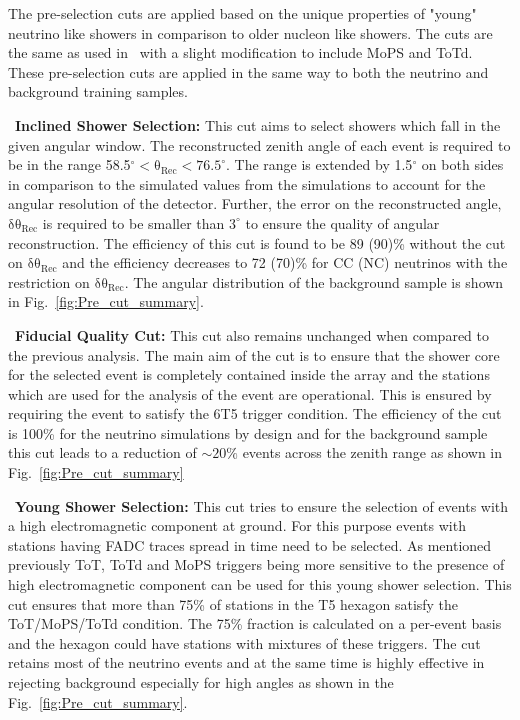 The pre-selection cuts are applied based on the unique properties of "young" neutrino like showers in comparison to older nucleon like showers. The cuts are the same as used in~\cite{gap_note_2013} with a slight modification to include MoPS and ToTd. These pre-selection cuts are applied in the same way to both the neutrino and background training samples. 
\begin{description}
  \item ~\textbf{Inclined Shower Selection:} This cut aims to select showers which fall in the given angular window. The reconstructed zenith angle of each event is required to be in the range 58.5$^{\circ} < \mathrm{\theta_{Rec} < 76.5^{\circ}}$. The range is extended by 1.5$^\circ$ on both sides in comparison to the simulated values from the simulations to account for the angular resolution of the detector. Further, the error on the reconstructed angle, $\mathrm{\delta \theta_{\text{Rec}}}$ is required to be smaller than $3^\circ$ to ensure the quality of angular reconstruction. The efficiency of this cut is found to be 89 (90)\% without the cut on $\mathrm{\delta \theta_{\text{Rec}}}$ and the efficiency decreases to 72 (70)\% for CC (NC) neutrinos with the restriction on $\mathrm{\delta \theta_{\text{Rec}}}$. The angular distribution of the background sample is shown in Fig.~\ref{fig:Pre_cut_summary}.
  \item ~\textbf{Fiducial Quality Cut:} This cut also remains unchanged when compared to the previous analysis. The main aim of the cut is to ensure that the shower core for the selected event is completely contained inside the array and the stations which are used for the analysis of the event are operational. This is ensured by requiring the event to satisfy the 6T5 trigger condition. The efficiency of the cut is 100\% for the neutrino simulations by design and for the background sample this cut leads to a reduction of $\sim 20\%$ events across the zenith range as shown in Fig.~\ref{fig:Pre_cut_summary}   
  \item ~\textbf{Young Shower Selection:} This cut tries to ensure the selection of events with a high electromagnetic component at ground. For this purpose events with stations having FADC traces spread in time need to be selected. As mentioned previously ToT, ToTd and MoPS triggers being more sensitive to the presence of high electromagnetic component can be used for this young shower selection. This cut ensures that more than 75\% of stations in the T5 hexagon satisfy the ToT/MoPS/ToTd condition. The 75\% fraction is calculated on a per-event basis and the hexagon could have stations with mixtures of these triggers. The cut retains most of the neutrino events and at the same time is highly effective in rejecting background especially for high angles as shown in the Fig.~\ref{fig:Pre_cut_summary}.
  

\end{description}
